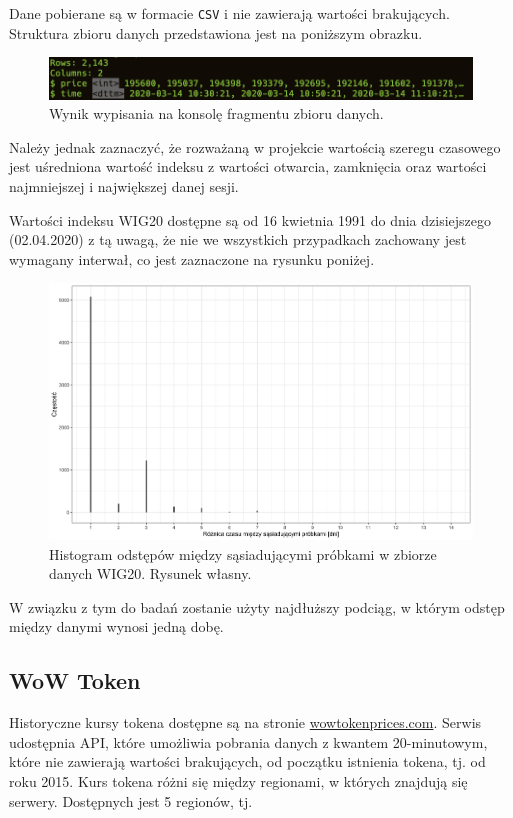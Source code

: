 \documentclass{article}
\begin{document}
Dane pobierane są w formacie \texttt{CSV} i nie zawierają wartości
brakujących. Struktura zbioru danych przedstawiona jest na poniższym
obrazku.

\begin{figure}[H]
  \centering
  \includegraphics[width=.75\textwidth]{./images/wt-glimpse.png}
  \caption{Wynik wypisania na konsolę fragmentu zbioru danych.}
\end{figure}

Należy jednak zaznaczyć, że rozważaną w projekcie wartością szeregu
czasowego jest uśredniona wartość indeksu z wartości otwarcia,
zamknięcia oraz wartości najmniejszej i największej danej sesji.

Wartości indeksu WIG20 dostępne są od 16 kwietnia 1991 do dnia
dzisiejszego (02.04.2020) z tą uwagą, że nie we wszystkich przypadkach
zachowany jest wymagany interwał, co jest zaznaczone na rysunku poniżej.

\begin{figure}[H]
  \centering
  \includegraphics[width=.75\textwidth]{./images/tdiff.png}
  \caption{Histogram odstępów między sąsiadującymi próbkami w zbiorze danych WIG20. Rysunek własny.}
\end{figure}

W związku z tym do badań zostanie użyty najdłuższy podciąg, w którym
odstęp między danymi wynosi jedną dobę.

\hypertarget{wow-token}{%
\subsection{WoW Token}\label{wow-token}}

Historyczne kursy tokena dostępne są na stronie
\href{https://wowtokenprices.com/}{wowtokenprices.com}. Serwis
udostępnia API, które umożliwia pobrania danych z kwantem 20-minutowym,
które nie zawierają wartości brakujących, od początku istnienia tokena,
tj. od roku 2015. Kurs tokena różni się między regionami, w których
znajdują się serwery. Dostępnych jest 5 regionów, tj.
\end{document}
